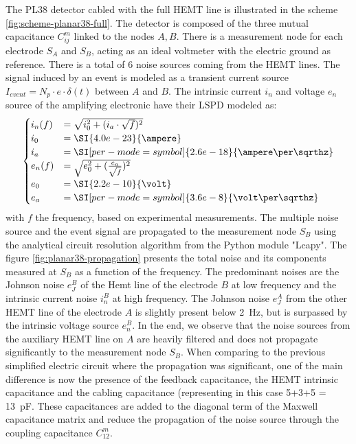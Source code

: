 The PL38 detector cabled with the full HEMT line is illustrated in the scheme \ref{fig:scheme-planar38-full}. The detector is composed of the three mutual capacitance $C_{ij}^m$ linked to the nodes $A,B$. There is a measurement node for each electrode $S_A$ and $S_B$, acting as an ideal voltmeter with the electric ground as reference. There is a total of 6 noise sources coming from the HEMT lines. The signal induced by an event is modeled as a transient current source $I_{event}=N_p \cdot e \cdot \delta(t)$ between $A$ and $B$. The intrinsic current $i_n$ and voltage $e_n$ source of the amplifying electronic have their LSPD modeled as:
\begin{equation}
\begin{cases}
i_n(f) &= \sqrt{ i_0^2 +(i_a \cdot \sqrt{f})^2 } \\
i_0 &= \SI{4.0e-23}{\ampere} \\
i_a &= \SI[per-mode=symbol]{2.6e-18}{\ampere\per\sqrthz} \\
e_n(f) &= \sqrt{ e_0^2 +(\frac{e_a}{\sqrt{f}})^2 } \\
e_0 &= \SI{2.2e-10}{\volt} \\
e_a &= \SI[per-mode=symbol]{3.6e-8}{\volt\per\sqrthz}
\end{cases}
\end{equation}
with $f$ the frequency, based on experimental measurements.
The multiple noise source and the event signal are propagated to the measurement node $S_B$ using the analytical circuit resolution algorithm from the Python module "Lcapy".
The figure \ref{fig:planar38-propagation} presents the total noise and its components measured at $S_B$ as a function of the frequency. The predominant noises are the Johnson noise $e_{J}^B$ of the Hemt line of the electrode $B$ at low frequency and the intrinsic current noise $i_n^B$ at high frequency. The Johnson noise $e_J^A$ from the other HEMT line of the electrode $A$ is slightly present below \SI{2}{\Hz}, but is surpassed by the intrinsic voltage source $e_n^B$. In the end, we observe that the noise sources from the auxiliary HEMT line on $A$ are heavily filtered and does not propagate significantly to the measurement node $S_B$. When comparing to the previous simplified electric circuit where the propagation was significant, one of the main difference is now the presence of the feedback capacitance, the HEMT intrinsic capacitance and the cabling capacitance (representing in this case 5+3+5 = \SI{13}{\pico\farad}. These capacitances are added to the diagonal term of the Maxwell capacitance matrix and reduce the propagation of the noise source through the coupling capacitance $C_{12}^m$.

